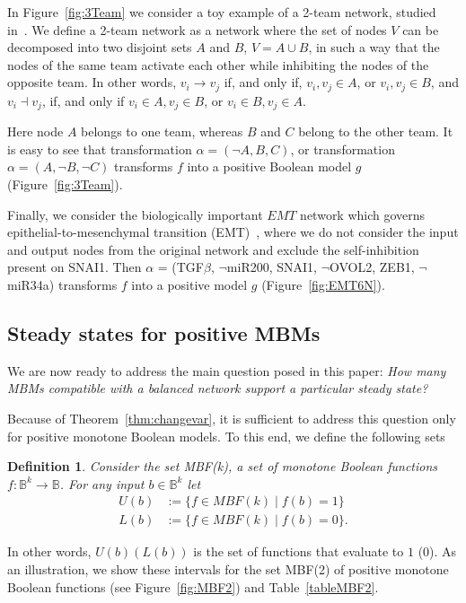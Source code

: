 \documentclass[10pt,letterpaper]{article}
\newcommand{\bbB}{\mathbb{B}}
\newtheorem{defn}[thm]{Definition}
\begin{document}
In Figure~\ref{fig:3Team} we consider a toy example of a 2-team network, studied in~\cite{hebbar_robustness_2022}. We define a 2-team network as a network where the set of nodes $V$ can be decomposed into two disjoint sets $A$ and $B$, $V=A \cup B$, in such a way that the nodes of the same team activate each other while inhibiting the nodes of the opposite team. In other words, $v_i\to v_j$ if, and only if, $v_i, v_j \in A$, or $v_i, v_j \in B$, and $v_i\dashv v_j$, if, and only if $v_i\in A, v_j \in B$, or $v_i\in B, v_j \in A$.

Here node $A$ belongs to one team, whereas $B$ and $C$ belong to the other team. It is easy to see that transformation $\alpha = (\neg A, B, C)$, or transformation $\alpha = (A, \neg B, \neg C)$ transforms $f$ into a positive Boolean model $g$ (Figure~\ref{fig:3Team}). 

Finally, we consider the biologically important $EMT$ network which governs epithelial-to-mesenchymal transition (EMT)~\cite{hong_ovol2-zeb1_2015,xin_multistability_2020}, where we do not consider the input and output nodes from the original network and exclude the self-inhibition present on SNAI1.
Then $\alpha$ = (TGF$\beta$, $\neg$miR200, SNAI1, $\neg$OVOL2, ZEB1, $\neg$miR34a) transforms $f$ into a positive model $g$ (Figure~\ref{fig:EMT6N}).

\subsection{Steady states for positive MBMs}\label{sec:mono}

We are now ready to address the main question posed in this paper: 
\textit{ How many MBMs compatible with a balanced network support a particular steady state? }

Because of Theorem~\ref{thm:changevar}, it is sufficient to address this question only for positive monotone Boolean models.
To this end, we define the following sets 
\begin{defn}\label{def:UL}
Consider the set MBF(k), a set of monotone Boolean functions $f:\bbB^k\to \bbB$.
For any input $b\in \bbB^k$ let
\begin{align*}
    U(b) &:=\{ f\in MBF(k) \;|\; f(b) = 1\} \\
    L(b) &:=\{ f\in MBF(k) \;|\; f(b) = 0\}.
\end{align*}
\end{defn}
In other words, $U(b) (L(b))$ is the set of functions that evaluate to $1$ ($0$). As an illustration, we show these intervals for the set MBF(2) of positive monotone Boolean functions (see Figure~\ref{fig:MBF2}) and  Table~\ref{tableMBF2}.
\end{document}
